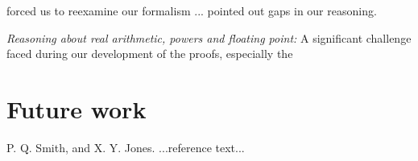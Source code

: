 \documentclass{sigplanconf}
\begin{document}
forced us to reexamine our formalism
... pointed out gaps in our reasoning.


\emph{Reasoning about real arithmetic, powers and floating point: }
A significant challenge faced during our development of the proofs, especially the

\section{Future work}















\begin{thebibliography}{}
\softraggedright
P. Q. Smith, and X. Y. Jones. ...reference text...

\end{thebibliography}
\end{document}
